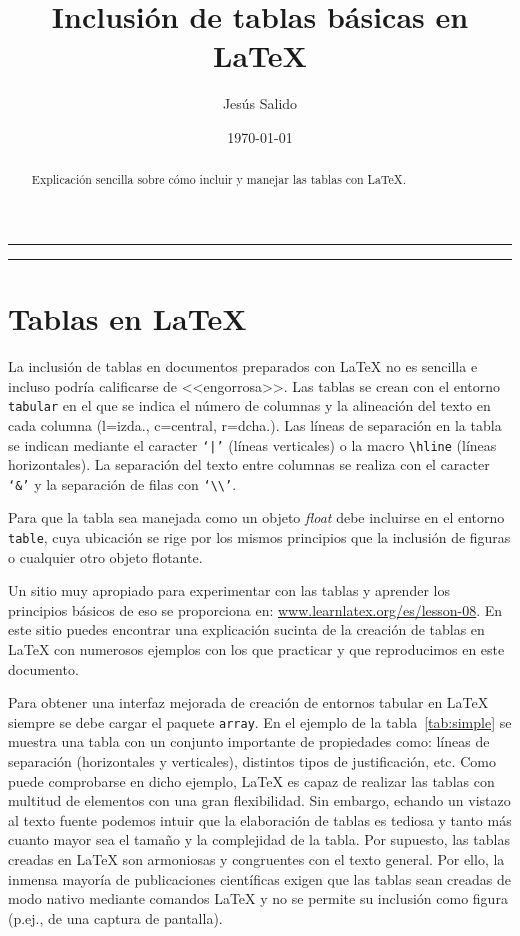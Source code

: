\documentclass[11pt,a4paper]{article}
\author{Jesús Salido}
\title{Inclusión de tablas básicas en \LaTeX{}}
\date{\today}
\begin{document}
\maketitle
\begin{abstract}
	Explicación sencilla sobre cómo incluir y manejar las tablas con \LaTeX{}.
\end{abstract}

\hrule
\tableofcontents
\listoftables
\bigskip
\hrule




\section{Tablas en \LaTeX{}}
La inclusión de tablas en documentos preparados con \LaTeX{} no es sencilla e incluso podría calificarse de <<engorrosa>>. Las tablas se crean con el entorno \texttt{tabular} en el que se indica el número de columnas y la alineación del texto en cada columna (l=izda., c=central, r=dcha.). Las líneas de separación en la tabla se indican mediante el caracter \texttt{`|'} (líneas verticales) o la macro \texttt{\textbackslash hline} (líneas horizontales). La separación del texto entre columnas se realiza con el caracter \texttt{`\&'} y la separación de filas con \texttt{`\textbackslash\textbackslash'}.

Para que la tabla sea manejada como un objeto \emph{float} debe incluirse en el entorno \texttt{table}, cuya ubicación se rige por los mismos principios que la inclusión de figuras o cualquier otro objeto flotante.

Un sitio muy apropiado para experimentar con las tablas y aprender los principios básicos de eso se proporciona en: \url{www.learnlatex.org/es/lesson-08}. En este sitio puedes encontrar una explicación sucinta de la creación de tablas en \LaTeX{} con numerosos ejemplos con los que practicar y que reproducimos en este documento.

Para obtener una interfaz mejorada de creación de entornos tabular en \LaTeX{} siempre se debe cargar el paquete \texttt{array}. En el ejemplo de la tabla~\ref{tab:simple} se muestra una tabla con un conjunto importante de propiedades como: líneas de separación (horizontales y verticales), distintos tipos de justificación, etc. Como puede comprobarse en dicho ejemplo, \LaTeX{} es capaz de realizar las tablas con multitud de elementos con una gran flexibilidad. Sin embargo, echando un vistazo al texto fuente podemos intuir que la elaboración de tablas es tediosa y tanto más cuanto mayor sea el tamaño y la complejidad de la tabla. Por supuesto, las tablas creadas en \LaTeX{} son armoniosas y congruentes con el texto general. Por ello, la inmensa mayoría de publicaciones científicas exigen que las tablas sean creadas de modo nativo mediante comandos \LaTeX{} y no se permite su inclusión como figura (p.ej., de una captura de pantalla).
\end{document}

